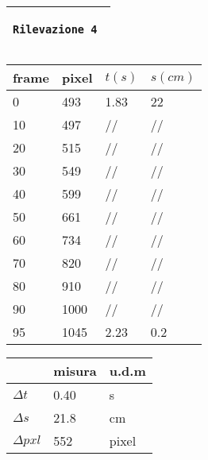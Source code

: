 \documentclass{article}
\begin{document}
\newpage
\begin{center}
\begin{tabular}{|m{15em}|}
	\hline
	
	\begin{center}
		\texttt \bf \large Rilevazione 4
	\end{center} \\
	\hline
\end{tabular}

\vspace{15pt}

\begin{tabular}{ | m{3em} | m{3em} | m{2.5em}| m{2.5em} | } 
 \hline
 \vspace{5pt} frame \vspace{5pt}  &  pixel & $t(s)$ & $s(cm)$\\ 
 \hline
 \hline
 0 & 493 & 1.83  & 22\\ 
 \hline
 10 & 497 & //  & //\\
 \hline
 20 & 515 & //  & //\\ 
 \hline
 30 & 549 & //  & //\\ 
 \hline
 40 & 599 & //  & //\\ 
 \hline
 50 & 661 & //  & //\\ 
 \hline
 60 & 734 & //  & //\\ 
 \hline
 70 & 820 & //  & //\\ 
 \hline
 80 & 910 & //  & //\\ 
 \hline
 90 & 1000 & //  & //\\ 
 \hline
 95 & 1045 & 2.23  & 0.2\\ 
 \hline
\end{tabular}

\vspace{5pt}

\begin{tabular}{ | m{3em} | m{3em} | m{1cm}| } 
 \hline
   &  misura & u.d.m \\ 
 \hline
 \hline
 $\Delta t$   &  0.40 	& s\\
 \hline
 $\Delta s$   &  21.8	& cm\\
 \hline
 $\Delta pxl$ & 552	& pixel\\
 \hline
\end{tabular}
\end{center}

\end{document}
